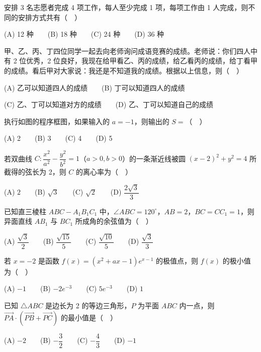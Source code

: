 \begin{question}
安排 3 名志愿者完成 4 项工作，每人至少完成 1 项，每项工作由 1 人完成，则不同的安排方式共有（　）

   (A) 12 种　　(B) 18 种　　(C) 24 种　　(D) 36 种

\end{question}
\begin{question}
甲、乙、丙、丁四位同学一起去向老师询问成语竞赛的成绩。老师说：你们四人中有 2 位优秀，2 位良好，我现在给甲看乙、丙的成绩，给乙看丙的成绩，给丁看甲的成绩。看后甲对大家说：我还是不知道我的成绩。根据以上信息，则（　）

   (A) 乙可以知道四人的成绩　　(B) 丁可以知道四人的成绩

   (C) 乙、丁可以知道对方的成绩　　(D) 乙、丁可以知道自己的成绩

\Needspace{0.4\textheight}
\end{question}
\begin{question}
执行如图的程序框图，如果输入的 \(a=-1\)，则输出的 \(S=\)（　）
\nopagebreak[4]
\begin{center}\end{center}
\nopagebreak[4]
   (A) 2　　(B) 3　　(C) 4　　(D) 5

\end{question}
\begin{question}
若双曲线 \(C:\dfrac{x^2}{a^2}-\dfrac{y^2}{b^2}=1\)（\(a>0,b>0\)）的一条渐近线被圆 \((x-2)^2+y^2=4\) 所截得的弦长为 2，则 \(C\) 的离心率为（　）

   (A) \(2\)　　(B) \(\sqrt{3}\)　　(C) \(\sqrt{2}\)　　(D) \(\dfrac{2\sqrt{3}}{3}\)

\end{question}
\begin{question}
已知直三棱柱 \(ABC-A_1B_1C_1\) 中，\(\angle ABC=120^\circ\)，\(AB=2\)，\(BC=CC_1=1\)，则异面直线 \(AB_1\) 与 \(BC_1\) 所成角的余弦值为（　）

   (A) \(\dfrac{\sqrt{3}}{2}\)　　(B) \(\dfrac{\sqrt{15}}{5}\)　　(C) \(\dfrac{\sqrt{10}}{5}\)　　(D) \(\dfrac{\sqrt{3}}{3}\)

\end{question}
\begin{question}
若 \(x=-2\) 是函数 \(f(x)=(x^2+ax-1)e^{x-1}\) 的极值点，则 \(f(x)\) 的极小值为（　）

   (A) \(-1\)　　(B) \(-2e^{-3}\)　　(C) \(5e^{-3}\)　　(D) \(1\)

\end{question}
\begin{question}
已知 \(\triangle ABC\) 是边长为 2 的等边三角形，\(P\) 为平面 \(ABC\) 内一点，则 \(\overrightarrow{PA}\cdot(\overrightarrow{PB}+\overrightarrow{PC})\) 的最小值是（　）

   (A) \(-2\)　　(B) \(-\dfrac{3}{2}\)　　(C) \(-\dfrac{4}{3}\)　　(D) \(-1\)

\end{question}

